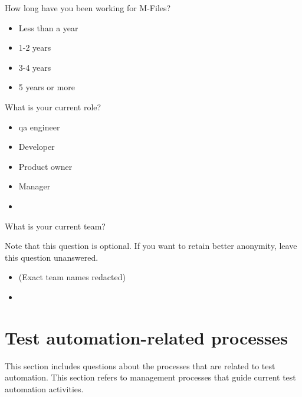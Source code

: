 \begin{question}
	\item How long have you been working for M-Files?\surveyasterix\greencheckmark
	\begin{itemize}[noitemsep, leftmargin=1.5em]
		\renewcommand\labelitemi{\radiobutton}
		\item Less than a year
		\item 1-2 years
		\item 3-4 years
		\item 5 years or more
	\end{itemize}
	\item What is your current role?\surveyasterix\greencheckmark
	\begin{itemize}[noitemsep, leftmargin=1.5em]
		\renewcommand\labelitemi{\radiobutton}
		\item \gls{qa} engineer
		\item Developer
		\item Product owner
		\item Manager
		\item \othertextfield
	\end{itemize}
	\item What is your current team?\redcross\\
	\begin{surveydescription}
		Note that this question is optional. If you want to retain better anonymity, leave this question unanswered.
	\end{surveydescription}
	\begin{itemize}[noitemsep, leftmargin=1.5em]
		\renewcommand\labelitemi{\radiobutton}
		\item (Exact team names redacted)
		\item \othertextfield
	\end{itemize}
\end{question}

\section*{Test automation-related processes}
This section includes questions about the processes that are related to test automation. This section refers to management processes that guide current test automation activities.

